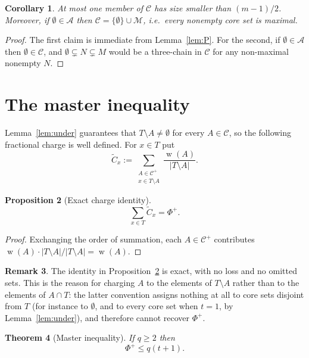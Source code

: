 \documentclass[11pt,a4paper]{amsart}
\theoremstyle{plain}
\newtheorem{theorem}{Theorem}[section]
\newtheorem{proposition}[theorem]{Proposition}
\newtheorem{corollary}[theorem]{Corollary}
\theoremstyle{definition}
\newtheorem{remark}[theorem]{Remark}
\newcommand{\A}{\mathcal{A}}
\newcommand{\Cc}{\mathcal{C}}
\newcommand{\Mm}{\mathcal{M}}
\newcommand{\Cp}{\Cc^{+}}
\DeclareMathOperator{\wt}{w}
\begin{document}
\begin{corollary}\label{cor:empty}
At most one member of $\Cc$ has size smaller than $(m-1)/2$. Moreover, if
$\emptyset\in\A$ then $\Cc=\{\emptyset\}\cup\Mm$, i.e.\ every nonempty core set
is maximal.
\end{corollary}

\begin{proof}
The first claim is immediate from Lemma~\ref{lem:P}. For the second, if
$\emptyset\in\A$ then $\emptyset\in\Cc$, and
$\emptyset\subsetneq N\subsetneq M$ would be a three-chain in $\Cc$ for any
non-maximal nonempty $N$.
\end{proof}

\section{The master inequality}\label{sec:master}

Lemma~\ref{lem:under} guarantees that $T\setminus A\neq\emptyset$ for every
$A\in\Cc$, so the following fractional charge is well defined. For $x\in T$ put
\begin{equation}\label{eq:charge}
  \widetilde C_x
  :=
  \sum_{\substack{A\in\Cp\\ x\in T\setminus A}}
  \frac{\wt(A)}{|T\setminus A|}.
\end{equation}

\begin{proposition}[Exact charge identity]\label{prop:identity}
\[
  \sum_{x\in T}\widetilde C_x=\Phi^+.
\]
\end{proposition}

\begin{proof}
Exchanging the order of summation, each $A\in\Cp$ contributes
$\wt(A)\cdot|T\setminus A|/|T\setminus A|=\wt(A)$.
\end{proof}

\begin{remark}\label{rem:whycharge}
The identity in Proposition~\ref{prop:identity} is exact, with no loss and no
omitted sets. This is the reason for charging $A$ to the elements of
$T\setminus A$ rather than to the elements of $A\cap T$: the latter convention
assigns nothing at all to core sets disjoint from $T$ (for instance to
$\emptyset$, and to every core set when $t=1$, by Lemma~\ref{lem:under}), and
therefore cannot recover $\Phi^+$.
\end{remark}

\begin{theorem}[Master inequality]\label{thm:master}
If $q\ge2$ then
\[
  \Phi^+\le q(t+1).
\]
\end{theorem}
\end{document}
